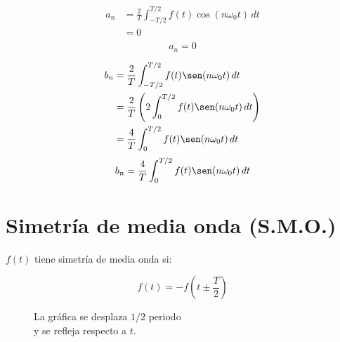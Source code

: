 \begin{equation*}
\begin{split}
    a_n
        &=\frac{2}{T}\int_{-T/2}^{T/2} f(t)\cos(n\omega_0 t)\,dt\\
        &=0\\
\end{split}
\end{equation*}
\begin{equation}
    a_n=0
\end{equation}

\begin{equation*}
\begin{split}
    b_n
        &=\frac{2}{T}\int_{-T/2}^{T/2} f(t)\sen(n\omega_0 t)\,dt\\
        &=\frac{2}{T}\left(2\int_0^{T/2} f(t)\sen(n\omega_0 t)\,dt\right)\\
        &=\frac{4}{T}\int_0^{T/2}f(t)\sen(n\omega_0 t)\,dt\\
\end{split}
\end{equation*}
\begin{equation}
    b_n=\frac{4}{T}\int_0^{T/2}f(t)\sen(n\omega_0 t)\,dt
\end{equation}

\section{Simetría de media onda (S.M.O.)}
$f(t)$ tiene simetría de media onda si:

\begin{equation*}
    f(t)=-f(t\pm\frac{T}{2})
\end{equation*}

\begin{figure}[H]
    \centering
    
    \caption{La gráfica se desplaza $1/2$ periodo\\
    y se refleja respecto a $t$.}
\end{figure}

